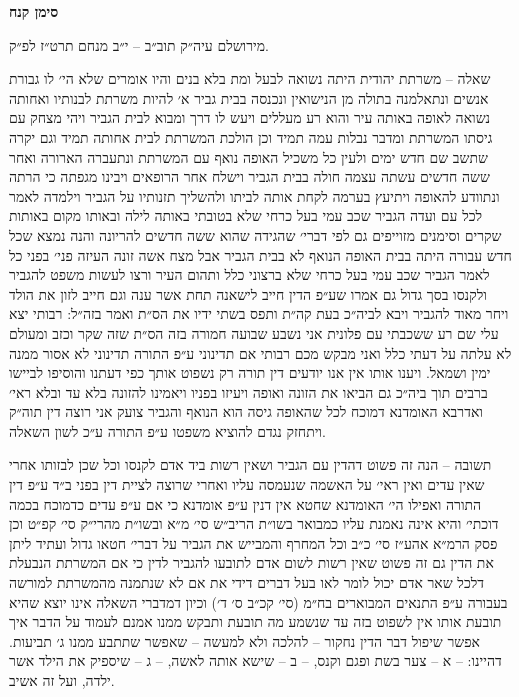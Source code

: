 \documentclass[12pt, openany]{book}
\newcommand{\chapname}{}
\newcommand{\newchap}[1]{
	\addcontentsline{toc}{chapter}{#1}
	\renewcommand{\chapname}{#1}
		\begin{center}
			\textbf{%
\fontsize{16pt}{16pt}\selectfont
				#1}
		\end{center}
}
\begin{document}
\newchap{סימן קנח}
\begin{multicols}{2}
מירושלם עיה״ק תוב״ב – י״ב מנחם תרט״ז לפ״ק.\\\vspace{0pt}

שאלה – משרתת יהודית היתה נשואה לבעל ומת בלא בנים והיו אומרים שלא הי׳ לו גבורת אנשים ונתאלמנה בתולה מן הנישואין ונכנסה בבית גביר א׳ להיות משרתת לבנותיו ואחותה נשואה לאופה באותה עיר והוא רע מעללים ויעש לו דרך ומבוא לבית הגביר ויהי מצחק עם גיסתו המשרתת ומדבר נבלות עמה תמיד וכן הולכת המשרתת לבית אחותה תמיד וגם יקרה שתשב שם חדש ימים ולעין כל משכיל האופה נואף עם המשרתת ונתעברה הארורה ואחר ששה חדשים עשתה עצמה חולה בבית הגביר וישלח אחר הרופאים ויבינו מגפתה כי הרתה ונתוודע להאופה ויתיעץ בערמה לקחת אותה לביתו ולהשליך תזנותיו על הגביר וילמדה לאמר לכל עם ועדה הגביר שכב עמי בעל כרחי שלא בטובתי באותה לילה ובאותו מקום באותות שקרים וסימנים מזוייפים גם לפי דברי׳ שהגידה שהוא ששה חדשים להריונה והנה נמצא שכל חדש עבורה היתה בבית האופה הנואף לא בבית הגביר אבל מצח אשה זונה העיזה פני׳ בפני כל לאמר הגביר שכב עמי בעל כרחי שלא ברצוני כלל ותהום העיר ורצו לעשות משפט להגביר ולקנסו בסך גדול גם אמרו שע״פ הדין חייב לישאנה תחת אשר ענה וגם חייב לזון את הולד ויחר מאוד להגביר ויבא לביה״כ בעת קה״ת ותפס בשתי ידיו את הס״ת ואמר בזה״ל: רבותי יצא עלי שם רע ששכבתי עם פלונית אני נשבע שבועה חמורה בזה הס״ת שזה שקר וכזב ומעולם לא עלתה על דעתי כלל ואני מבקש מכם רבותי אם תדינוני ע״פ התורה תדינוני לא אסור ממנה ימין ושמאל. ויענו אותו אין אנו יודעים דין תורה רק נשפוט אותך כפי דעתנו והוסיפו לביישו ברבים תוך ביה״כ גם הביאו את הזונה ואופה ויעיזו בפניו ויאמינו להזונה בלא עד ובלא ראי׳ ואדרבא האומדנא דמוכח לכל שהאופה גיסה הוא הנואף והגביר צועק אני רוצה דין תוה״ק ויתחזק נגדם להוציא משפטו ע״פ התורה ע״כ לשון השאלה.\\\vspace{0pt}

תשובה – הנה זה פשוט דהדין עם הגביר ושאין רשות ביד אדם לקנסו וכל שכן לבזותו אחרי שאין עדים ואין ראי׳ על האשמה שנעמסה עליו ואחרי שרוצה לציית דין בפני ב״ד ע״פ דין התורה ואפילו הי׳ האומדנא שחטא אין דנין ע״פ אומדנא כי אם ע״פ עדים כדמוכח בכמה דוכתי׳ והיא אינה נאמנת עליו כמבואר בשו״ת הריב״ש סי׳ מ״א ובשו״ת מהרי״ק סי׳ קפ״ט וכן פסק הרמ״א אהע״ז סי׳ כ״ב וכל המחרף והמבייש את הגביר על דברי׳ חטאו גדול ועתיד ליתן את הדין גם זה פשוט שאין רשות לשום אדם לתובעו להגביר לדין כי אם המשרתת הנבעלת דלכל שאר אדם יכול לומר לאו בעל דברים דידי את אם לא שנתמנה מהמשרתת למורשה בעבורה ע״פ התנאים המבוארים בח״מ (סי׳ קכ״ב ס׳ ד׳) וכיון דמדברי השאלה אינו יוצא שהיא תובעת אותו אין לשפוט בזה עד שנשמע מה תובעת ותבקש ממנו אמנם לעמוד על הדבר איך אפשר שיפול דבר הדין נחקור – להלכה ולא למעשה – שאפשר שתתבע ממנו ג׳ תביעות. דהיינו: – א – צער בשת ופגם וקנס, – ב – שישא אותה לאשה, – ג – שיספיק את הילד אשר ילדה, ועל זה אשיב.\\\vspace{0pt}


\end{multicols}
\end{document}
